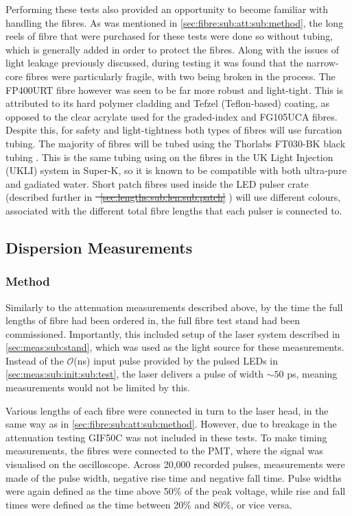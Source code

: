 \documentclass[a4paper,11pt]{article}
\let\oldsim\sim
\renewcommand{\sim}{{\oldsim}}
\providecommand{\DIFaddtex}[1]{{\protect\color{blue}\uwave{#1}}} %
\providecommand{\DIFdeltex}[1]{{\protect\color{red}\sout{#1}}}                      %
\providecommand{\DIFaddbegin}{} %
\providecommand{\DIFaddend}{} %
\providecommand{\DIFdelbegin}{} %
\providecommand{\DIFdelend}{} %
\providecommand{\DIFadd}[1]{\texorpdfstring{\DIFaddtex{#1}}{#1}} %
\providecommand{\DIFdel}[1]{\texorpdfstring{\DIFdeltex{#1}}{}} %
\newcommand{\DIFscaledelfig}{0.5}
\newlength{\DIFdelgraphicswidth} %
\newlength{\DIFdelgraphicsheight} %
\newcommand{\DIFaddincludegraphics}[2][]{{\color{blue}\fbox{\DIFOincludegraphics[#1]{#2}}}} %
\newcommand{\DIFdelincludegraphics}[2][]{%
\sbox{\DIFdelgraphicsbox}{\DIFOincludegraphics[#1]{#2}}%
\settoboxwidth{\DIFdelgraphicswidth}{\DIFdelgraphicsbox} %
\settoboxtotalheight{\DIFdelgraphicsheight}{\DIFdelgraphicsbox} %
\scalebox{\DIFscaledelfig}{%
\parbox[b]{\DIFdelgraphicswidth}{\usebox{\DIFdelgraphicsbox}\\[-\baselineskip] \rule{\DIFdelgraphicswidth}{0em}}\llap{\resizebox{\DIFdelgraphicswidth}{\DIFdelgraphicsheight}{%
\setlength{\unitlength}{\DIFdelgraphicswidth}%
\begin{picture}(1,1)%
\thicklines\linethickness{2pt} %
{\color[rgb]{1,0,0}\put(0,0){\framebox(1,1){}}}%
{\color[rgb]{1,0,0}\put(0,0){\line( 1,1){1}}}%
{\color[rgb]{1,0,0}\put(0,1){\line(1,-1){1}}}%
\end{picture}%
}\hspace*{3pt}}} %
} %
\DeclareRobustCommand{\DIFaddbegin}{\DIFOaddbegin \let\includegraphics\DIFaddincludegraphics} %
\DeclareRobustCommand{\DIFaddend}{\DIFOaddend \let\includegraphics\DIFOincludegraphics} %
\DeclareRobustCommand{\DIFdelbegin}{\DIFOdelbegin \let\includegraphics\DIFdelincludegraphics} %
\DeclareRobustCommand{\DIFdelend}{\DIFOaddend \let\includegraphics\DIFOincludegraphics} %
\begin{document}
Performing these tests also provided an opportunity to become familiar with handling the fibres. As was mentioned in \cref{sec:fibre:sub:att:sub:method}, the long reels of fibre that were purchased for these tests were done so without tubing, which is generally added in order to protect the fibres. Along with the issues of light leakage previously discussed, during testing it was found that the narrow-core fibres were particularly fragile, with two being broken in the process. The FP400URT fibre however was seen to be far more robust and light-tight. This is attributed to its hard polymer cladding and Tefzel (Teflon-based) coating, as opposed to the clear acrylate used for the graded-index and FG105UCA fibres. Despite this, for safety and light-tightness both types of fibres will use furcation tubing. The majority of fibres will be tubed using the Thorlabs FT030-BK black tubing \cite{bib:ft030bk}. This is the same tubing using on the fibres in the UK Light Injection (UKLI) system in Super-K, so it is known to be compatible with both ultra-pure and gadiated water. Short patch fibres used inside the LED pulser crate (described further in \DIFdelbegin \DIFdel{\mbox{%
\cref{sec:lengths:sub:len:sub:patch}}\hskip0pt%
}\DIFdelend \DIFaddbegin \DIFadd{\mbox{%
\cref{sec:lengths:sub:patch}}\hskip0pt%
}\DIFaddend ) will use different colours, associated with the different total fibre lengths that each pulser is connected to.

\subsection{Dispersion Measurements}

\subsubsection{Method}

Similarly to the attenuation measurements described above, by the time the full lengths of fibre had been ordered in, the full fibre test stand had been commissioned. Importantly, this included setup of the laser system described in \cref{sec:meas:sub:stand}, which was used as the light source for these measurements. Instead of the $\mathcal{O}$(ns) input pulse provided by the pulsed LEDs in \cref{sec:meas:sub:init:sub:test}, the laser delivers a pulse of width $\sim50$ ps, meaning measurements would not be limited by this.

Various lengths of each fibre were connected in turn to the laser head, in the same way as in \cref{sec:fibre:sub:att:sub:method}. However, due to breakage in the attenuation testing GIF50C was not included in these tests. To make timing measurements, the fibres were connected to the PMT, where the signal was visualised on the oscilloscope. Across 20,000 recorded pulses, measurements were made of the pulse width, negative rise time and negative fall time. Pulse widths were again defined as the time above 50\% of the peak voltage, while rise and fall times were defined as the time between 20\% and 80\%, or vice versa.
\end{document}
